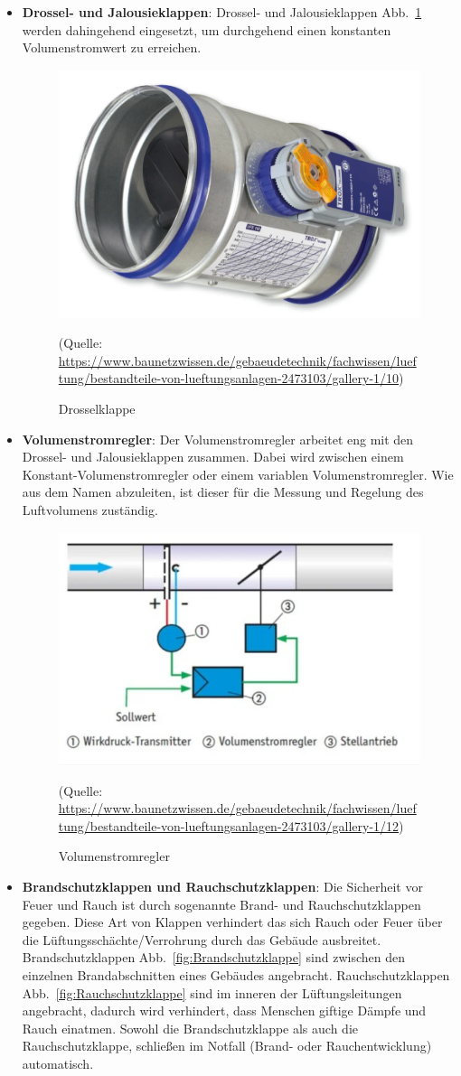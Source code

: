 \begin{itemize}
	\item \textbf{Drossel- und Jalousieklappen}: 
	Drossel- und Jalousieklappen Abb.~\ref{fig:drosselklappe} werden dahingehend eingesetzt, um durchgehend einen konstanten Volumenstromwert zu erreichen. 

\begin{figure}[H]
	\centering
	\includegraphics[width=0.5\linewidth]{Bilder/drosselklappe}
	\caption{Drosselklappe} 
	(Quelle: \url{	https://www.baunetzwissen.de/gebaeudetechnik/fachwissen/lueftung/bestandteile-von-lueftungsanlagen-2473103/gallery-1/10})
	\label{fig:drosselklappe}
\end{figure}

	\item \textbf{Volumenstromregler}: Der Volumenstromregler arbeitet eng mit den Drossel- und Jalousieklappen zusammen. Dabei wird zwischen einem Konstant-Volumenstromregler oder einem variablen Volumenstromregler. Wie aus dem Namen abzuleiten, ist dieser für die Messung und Regelung des Luftvolumens zuständig. 

\begin{figure}[H]
	\centering
	\includegraphics[width=0.5\linewidth]{Bilder/volumenstromregler}
	\caption{Volumenstromregler} 
	(Quelle: \url{	https://www.baunetzwissen.de/gebaeudetechnik/fachwissen/lueftung/bestandteile-von-lueftungsanlagen-2473103/gallery-1/12})
	\label{fig:volumenstromregler}
\end{figure}

	\item \textbf{Brandschutzklappen und Rauchschutzklappen}:
	Die Sicherheit vor Feuer und Rauch ist durch sogenannte Brand- und Rauchschutzklappen gegeben.
	Diese Art von Klappen verhindert das sich Rauch oder Feuer über die Lüftungsschächte/Verrohrung durch das Gebäude ausbreitet. Brandschutzklappen Abb.~\ref{fig:Brandschutzklappe} sind zwischen den einzelnen Brandabschnitten eines Gebäudes angebracht. Rauchschutzklappen Abb.~\ref{fig:Rauchschutzklappe} sind im inneren der Lüftungsleitungen angebracht, dadurch wird verhindert, dass Menschen giftige Dämpfe und Rauch einatmen. Sowohl die Brandschutzklappe als auch die Rauchschutzklappe, schließen im Notfall (Brand- oder Rauchentwicklung) automatisch.
\end{itemize}

